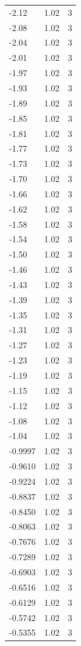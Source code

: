 \begin{longtable}{lrr}
  -2.12 & 1.02 & 3 \\
  -2.08 & 1.02 & 3 \\
  -2.04 & 1.02 & 3 \\
  -2.01 & 1.02 & 3 \\
  -1.97 & 1.02 & 3 \\
  -1.93 & 1.02 & 3 \\
  -1.89 & 1.02 & 3 \\
  -1.85 & 1.02 & 3 \\
  -1.81 & 1.02 & 3 \\
  -1.77 & 1.02 & 3 \\
  -1.73 & 1.02 & 3 \\
  -1.70 & 1.02 & 3 \\
  -1.66 & 1.02 & 3 \\
  -1.62 & 1.02 & 3 \\
  -1.58 & 1.02 & 3 \\
  -1.54 & 1.02 & 3 \\
  -1.50 & 1.02 & 3 \\
  -1.46 & 1.02 & 3 \\
  -1.43 & 1.02 & 3 \\
  -1.39 & 1.02 & 3 \\
  -1.35 & 1.02 & 3 \\
  -1.31 & 1.02 & 3 \\
  -1.27 & 1.02 & 3 \\
  -1.23 & 1.02 & 3 \\
  -1.19 & 1.02 & 3 \\
  -1.15 & 1.02 & 3 \\
  -1.12 & 1.02 & 3 \\
  -1.08 & 1.02 & 3 \\
  -1.04 & 1.02 & 3 \\
  -0.9997 & 1.02 & 3 \\
  -0.9610 & 1.02 & 3 \\
  -0.9224 & 1.02 & 3 \\
  -0.8837 & 1.02 & 3 \\
  -0.8450 & 1.02 & 3 \\
  -0.8063 & 1.02 & 3 \\
  -0.7676 & 1.02 & 3 \\
  -0.7289 & 1.02 & 3 \\
  -0.6903 & 1.02 & 3 \\
  -0.6516 & 1.02 & 3 \\
  -0.6129 & 1.02 & 3 \\
  -0.5742 & 1.02 & 3 \\
  -0.5355 & 1.02 & 3 \\

\end{longtable}
